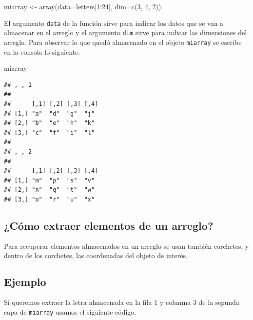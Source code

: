 \documentclass[
]{book}
\makeatletter
\newenvironment{Shaded}{\begin{snugshade}}{\end{snugshade}}
\newcommand{\AttributeTok}[1]{\textcolor[rgb]{0.77,0.63,0.00}{#1}}
\newcommand{\DecValTok}[1]{\textcolor[rgb]{0.00,0.00,0.81}{#1}}
\newcommand{\FunctionTok}[1]{\textcolor[rgb]{0.00,0.00,0.00}{#1}}
\newcommand{\NormalTok}[1]{#1}
\newcommand{\OtherTok}[1]{\textcolor[rgb]{0.56,0.35,0.01}{#1}}
\newcommand{\SpecialCharTok}[1]{\textcolor[rgb]{0.00,0.00,0.00}{#1}}
\newenvironment{kframe}{%
\medskip{}
\setlength{\fboxsep}{.8em}
 \def\at@end@of@kframe{}%
 \ifinner\ifhmode%
  \def\at@end@of@kframe{\end{minipage}}%
  \begin{minipage}{\columnwidth}%
 \fi\fi%
 \def\FrameCommand##1{\hskip\@totalleftmargin \hskip-\fboxsep
 \colorbox{shadecolor}{##1}\hskip-\fboxsep
     \hskip-\linewidth \hskip-\@totalleftmargin \hskip\columnwidth}%
 \MakeFramed {\advance\hsize-\width
   \@totalleftmargin\z@ \linewidth\hsize
   \@setminipage}}%
 {\par\unskip\endMakeFramed%
 \at@end@of@kframe}
\renewenvironment{Shaded}{\begin{kframe}}{\end{kframe}}
\makeatother
\begin{document}
\begin{Shaded}
\begin{Highlighting}[]
\NormalTok{miarray }\OtherTok{\textless{}{-}} \FunctionTok{array}\NormalTok{(}\AttributeTok{data=}\NormalTok{letters[}\DecValTok{1}\SpecialCharTok{:}\DecValTok{24}\NormalTok{], }\AttributeTok{dim=}\FunctionTok{c}\NormalTok{(}\DecValTok{3}\NormalTok{, }\DecValTok{4}\NormalTok{, }\DecValTok{2}\NormalTok{))}
\end{Highlighting}
\end{Shaded}

El argumento \texttt{data} de la función sirve para indicar los datos que se van a almacenar en el arreglo y el argumento \texttt{dim} sirve para indicar las dimensiones del arreglo. Para observar lo que quedó almacenado en el objeto \texttt{miarray} se escribe en la consola lo siguiente.

\begin{Shaded}
\begin{Highlighting}[]
\NormalTok{miarray}
\end{Highlighting}
\end{Shaded}

\begin{verbatim}
## , , 1
## 
##      [,1] [,2] [,3] [,4]
## [1,] "a"  "d"  "g"  "j" 
## [2,] "b"  "e"  "h"  "k" 
## [3,] "c"  "f"  "i"  "l" 
## 
## , , 2
## 
##      [,1] [,2] [,3] [,4]
## [1,] "m"  "p"  "s"  "v" 
## [2,] "n"  "q"  "t"  "w" 
## [3,] "o"  "r"  "u"  "x"
\end{verbatim}

\hypertarget{cuxf3mo-extraer-elementos-de-un-arreglo}{%
\subsection{¿Cómo extraer elementos de un arreglo?}\label{cuxf3mo-extraer-elementos-de-un-arreglo}}

Para recuperar elementos almacenados en un arreglo se usan también corchetes, y dentro de los corchetes, las coordenadas del objeto de interés.

\hypertarget{ejemplo-2}{%
\subsection*{Ejemplo}\label{ejemplo-2}}

Si queremos extraer la letra almacenada en la fila 1 y columna 3 de la segunda capa de \texttt{miarray} usamos el siguiente código.
\end{document}
